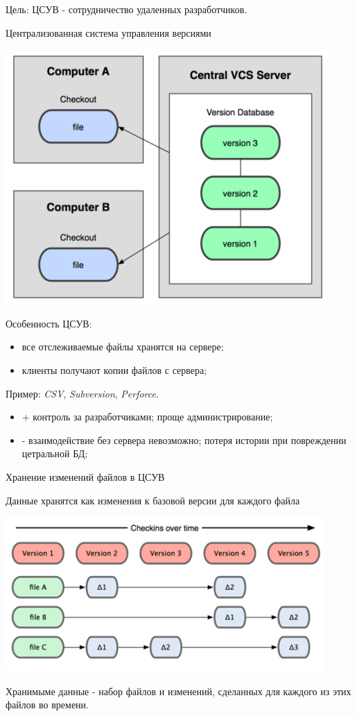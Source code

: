 \documentclass{beamer}
\begin{document}
\begin{frame}
Цель: ЦСУВ - сотрудничество удаленных разработчиков.
\begin{block}{Централизованная система управления версиями}
\begin{center}
\includegraphics[scale=0.4]{images/central.png}
\end{center}
\end{block}
Особенность ЦСУВ:
\begin{itemize}
\item все отслеживаемые файлы хранятся на сервере;
\item клиенты получают копии файлов с сервера;
\end{itemize}
Пример: \textit{CSV}, \textit{Subversion}, \textit{Perforce}.
\begin{itemize}
\item + контроль за разработчиками; проще администрирование;
\item - взаимодействие без сервера невозможно; потеря истории при повреждении цетральной БД;
\end{itemize}
\end{frame} 

\begin{frame}{Хранение изменений файлов в ЦСУВ}
\begin{block}{Данные хранятся как изменения к базовой версии для каждого файла}
\begin{center}
\includegraphics[scale=0.7]{images/patch.png}
\end{center}
\end{block}
Хранимыме данные - набор файлов и изменений, сделанных для каждого из этих файлов во времени.
\end{frame} 
\end{document}
